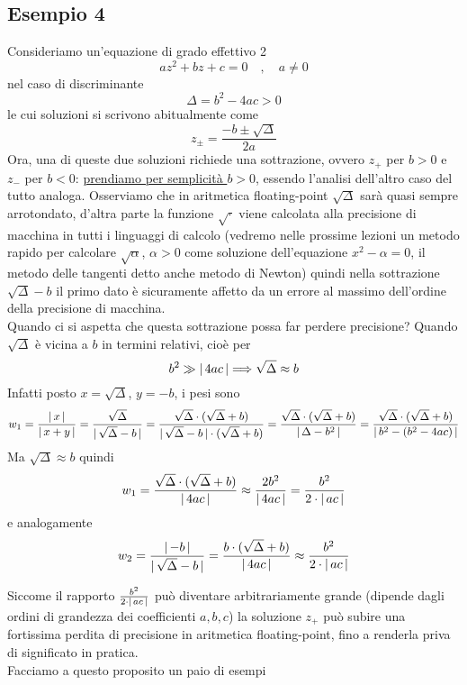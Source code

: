 \subsection{Esempio 4}
Consideriamo un'equazione di grado effettivo 2 \[az^2+bz+c=0 \quad , \quad a \ne 0\]
nel caso di discriminante \[\Delta = b^2 -4ac >0\] 
le cui soluzioni si scrivono abitualmente come \[z_{\pm} = \frac{-b \pm \sqrt{\Delta}}{2a}\]
Ora, una di queste due soluzioni richiede una sottrazione, ovvero $z_+$ per $b>0$ e $z_-$ per $b <0 $: \uline{prendiamo per semplicità $b>0$}, essendo l'analisi dell'altro caso del tutto analoga. Osserviamo che in aritmetica floating-point $\sqrt{\Delta}$ sarà quasi sempre arrotondato, d'altra parte la funzione $\sqrt{\cdot}$ viene calcolata alla precisione di macchina in tutti i linguaggi di calcolo (vedremo nelle prossime lezioni un metodo rapido per calcolare $\sqrt{\alpha}$, $\alpha>0$ come soluzione dell'equazione $x^2-\alpha = 0$, il metodo delle tangenti detto anche metodo di Newton) quindi nella sottrazione $\sqrt{\Delta} -b$ il primo dato è sicuramente affetto da un errore al massimo dell'ordine della precisione di macchina.\\
Quando ci si aspetta che questa sottrazione possa far perdere precisione? Quando $\sqrt{\Delta}$ è vicina a $b$ in termini relativi, cioè per 
\[b^2 \gg \lvert\,4ac\,\rvert \Longrightarrow \sqrt{\Delta} \approx b\]
Infatti posto $x = \sqrt{\Delta}$, $y = -b$, i pesi sono
\[w_1 = \frac{\lvert\,x\,\rvert}{\lvert\,x+y\,\rvert} = \frac{\sqrt{\Delta}}{\lvert\,\sqrt{\Delta}-b\,\rvert} = \frac{\sqrt{\Delta}\cdot (\sqrt{\Delta}+b)}{\lvert\,\sqrt{\Delta}-b\,\rvert\cdot (\sqrt{\Delta}+b)} = \frac{\sqrt{\Delta}\cdot (\sqrt{\Delta}+b)}{\lvert\,\Delta - b^2\,\rvert} = \frac{\sqrt{\Delta}\cdot (\sqrt{\Delta}+b)}{\lvert\,b^2 - (b^2-4ac)\,\rvert}\]
Ma $\sqrt{\Delta} \approx b$ quindi
\[w_1 = \frac{\sqrt{\Delta}\cdot (\sqrt{\Delta}+b)}{\lvert\,4ac\,\rvert} \approx \frac{2b^2}{\lvert\,4ac\,\rvert} = \frac{b^2}{2 \cdot\lvert\,ac\,\rvert}\]
e analogamente
\[w_2 = \frac{\lvert\,-b\,\rvert}{\lvert\,\sqrt{\Delta}-b\,\rvert} = \frac{b\cdot (\sqrt{\Delta}+b)}{\lvert\,4ac\,\rvert} \approx \frac{b^2}{2 \cdot\lvert\,ac\,\rvert}\]

Siccome il rapporto $\frac{b^2}{2 \cdot\lvert\,ac\,\rvert}$ può diventare arbitrariamente grande (dipende dagli ordini di grandezza dei coefficienti $a, b, c$) la soluzione $z_+$ può subire una fortissima perdita di precisione in aritmetica floating-point, fino a renderla priva di significato in pratica.\\ 
Facciamo a questo proposito un paio di esempi 

